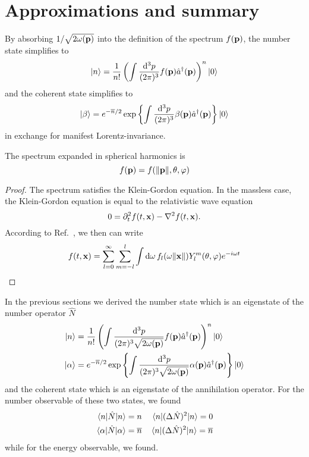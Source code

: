 \section{Approximations and summary}
 
\begin{lemma}
	By absorbing $1/\sqrt{2\omega(\vb{p})}$ into the definition of the spectrum $f(\vb{p})$, the number state simplifies to
	\begin{equation}
		\ket{n}
		=
		\frac{1}{n!}
		\left(
			\int\frac{\dd[3]{p}}{(2\pi)^3}
			f(\vb{p})
			\hat{a}^\dagger(\vb{p})
		\right)^n
		\ket{0}
	\end{equation}
	and the coherent state simplifies to
	\begin{equation}
		\ket{\beta}
		=
		e^{-\overline{n}/2}
		\exp\left\{
			\int\frac{\dd[3]{p}}{(2\pi)^3}
			\beta(\vb{p})
			\hat{a}^\dagger(\vb{p})
		\right\}
		\ket{0}
	\end{equation}
	in exchange for manifest Lorentz-invariance.
\end{lemma}
\begin{theorem}
	The spectrum expanded in spherical harmonics is
	\begin{equation}
		f(\vb{p})
		=
		f(\norm{\vb{p}},\theta,\varphi)
	\end{equation}
\end{theorem}
\begin{proof}
	The spectrum satisfies the Klein-Gordon equation.
	In the massless case, the Klein-Gordon equation is equal to the relativistic wave equation
	\begin{equation}
		0
		=
		\partial_t^2
		f(t,\vb{x})
		-
		\laplacian
		f(t,\vb{x})
		.
	\end{equation}
	According to Ref.~\cite[p.~538]{Jackson2007}, we then can write
	\begin{equation}
		f(t,\vb{x})
		=
		\sum_{l=0}^\infty
		\sum_{m=-l}^l
		\int\dd{\omega}
		f_l(\omega\norm{\vb{x}})
		Y_l^m(\theta,\varphi)
		e^{-i\omega t}
	\end{equation}
\end{proof}

In the previous sections we derived the number state which is an eigenstate of the number operator $\hat{N}$
\begin{align}
	\ket{n}
	&=
	\frac{1}{n!}
	\left(
		\int\frac{\dd[3]{p}}{(2\pi)^3\sqrt{2\omega(\vb{p})}}
		f(\vb{p})
		\hat{a}^\dagger(\vb{p})
	\right)^n
	\ket{0}
	\\
	\ket{\alpha}
	&=
	e^{-\overline{n}/2}
	\exp\left\{
		\int\frac{\dd[3]{p}}{(2\pi)^3\sqrt{2\omega(\vb{p})}}
		\alpha(\vb{p})
		\hat{a}^\dagger(\vb{p})
	\right\}
	\ket{0}
\end{align}
and the coherent state which is an eigenstate of the annihilation operator.
For the number observable of these two states, we found
\begin{align}
	\expval{\hat{N}}{n}
	=
	n
	&&
	\expval{(\Delta\hat{N})^2}{n}
	=
	0
	\\
	\expval{\hat{N}}{\alpha}
	=
	\overline{n}
	&&
	\expval{(\Delta\hat{N})^2}{n}
	=
	\overline{n}
\end{align}
while for the energy observable, we found.

